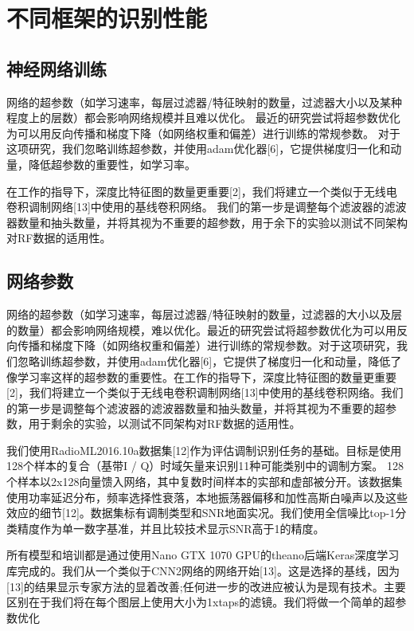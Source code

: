 \section{不同框架的识别性能}

\subsection{神经网络训练}


网络的超参数（如学习速率，每层过滤器/特征映射的数量，过滤器大小以及某种程度上的层数）都会影响网络规模并且难以优化。 最近的研究尝试将超参数优化为可以用反向传播和梯度下降（如网络权重和偏差）进行训练的常规参数。 对于这项研究，我们忽略训练超参数，并使用adam优化器[6]，它提供梯度归一化和动量，降低超参数的重要性，如学习率。

在工作的指导下，深度比特征图的数量更重要[2]，我们将建立一个类似于无线电卷积调制网络[13]中使用的基线卷积网络。 我们的第一步是调整每个滤波器的滤波器数量和抽头数量，并将其视为不重要的超参数，用于余下的实验以测试不同架构对RF数据的适用性。

\subsection{网络参数}
网络的超参数（如学习速率，每层过滤器/特征映射的数量，过滤器的大小以及层的数量）都会影响网络规模，难以优化。最近的研究尝试将超参数优化为可以用反向传播和梯度下降（如网络权重和偏差）进行训练的常规参数。对于这项研究，我们忽略训练超参数，并使用adam优化器[6]，它提供了梯度归一化和动量，降低了像学习率这样的超参数的重要性。在工作的指导下，深度比特征图的数量更重要[2]，我们将建立一个类似于无线电卷积调制网络[13]中使用的基线卷积网络。我们的第一步是调整每个滤波器的滤波器数量和抽头数量，并将其视为不重要的超参数，用于剩余的实验，以测试不同架构对RF数据的适用性。\par

我们使用RadioML2016.10a数据集[12]作为评估调制识别任务的基础。目标是使用128个样本的复合（基带I / Q）时域矢量来识别11种可能类别中的调制方案。 128个样本以2x128向量馈入网络，其中复数时间样本的实部和虚部被分开。该数据集使用功率延迟分布，频率选择性衰落，本地振荡器偏移和加性高斯白噪声以及这些效应的细节[12]。数据集标有调制类型和SNR地面实况。我们使用全信噪比top-1分类精度作为单一数字基准，并且比较技术显示SNR高于1的精度。\par

所有模型和培训都是通过使用Nano GTX 1070 GPU的theano后端Keras深度学习库完成的。我们从一个类似于CNN2网络的网络开始[13]。这是选择的基线，因为[13]的结果显示专家方法的显着改善;任何进一步的改进应被认为是现有技术。主要区别在于我们将在每个图层上使用大小为1xtaps的滤镜。我们将做一个简单的超参数优化\par

